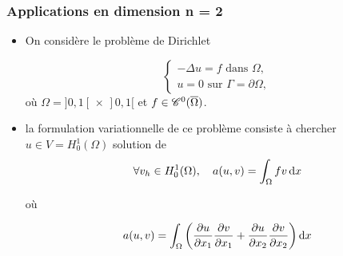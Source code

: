 \documentclass{beamer}
\def \de {{\rm d}}
\begin{document}
\begin{frame}
\frametitle{Applications en dimension n = 2}
\begin{itemize}
\item On considère le problème de Dirichlet

\begin{equation}
\left\{
\begin{array}{l}
-\Delta u= f \mbox{ dans } \Omega,\\
u=0 \mbox{ sur } \Gamma=\partial\Omega,
\end{array}
\right.
\label{dirichletDim2}
\end{equation}
où $\Omega = ]0,1[\, \times \,  ]0,1[$ et  $f\in {\cal C}^0(\overline{\Omega})$.
\item la formulation variationnelle de ce problème consiste à chercher $u\in V=H^1_0(\Omega)$ solution de
\begin{equation}
\forall v_h\in H^1_0(\Omega),\quad a(u,v)=\int_{\Omega} f v\,\de x
\label{dirichletDim2Variationnel}
\end{equation}

où

\begin{equation}
a(u,v)=\int_{\Omega}\left(\frac{\partial u}{\partial x_1}\frac{\partial v}{\partial x_1}+\frac{\partial u}{\partial x_2}\frac{\partial v}{\partial x_2}\right)\de x
\end{equation}
\end{itemize}


\end{frame}
\end{document}
